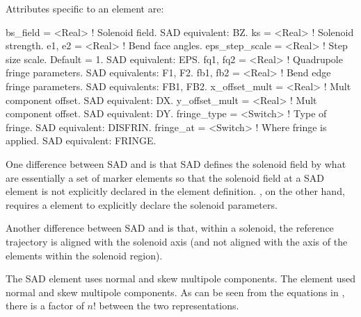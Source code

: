 {
Attributes specific to an  element are:
\begin{example}
  bs_field        = <Real>    ! Solenoid field. SAD equivalent: BZ.
  ks              = <Real>    ! Solenoid strength. 
  e1, e2          = <Real>    ! Bend face angles.
  eps_step_scale  = <Real>    ! Step size scale. Default = 1. SAD equivalent: EPS.
  fq1, fq2        = <Real>    ! Quadrupole fringe parameters. SAD equivalents: F1, F2.
  fb1, fb2        = <Real>    ! Bend edge fringe parameters. SAD equivalents: FB1, FB2.
  x_offset_mult   = <Real>    ! Mult component offset. SAD equivalent: DX.
  y_offset_mult   = <Real>    ! Mult component offset. SAD equivalent: DY.
  fringe_type     = <Switch>  ! Type of fringe. SAD equivalent: DISFRIN.
  fringe_at       = <Switch>  ! Where fringe is applied. SAD equivalent: FRINGE.
\end{example}


One difference between SAD and \bmad is that SAD defines the solenoid field by what are essentially
a set of marker elements so that the solenoid field at a SAD  element is not explicitly
declared in the  element definition. \bmad, on the other hand, requires a 
element to explicitly declare the solenoid parameters.

Another difference between SAD and \bmad is that, within a solenoid, the reference trajectory is
aligned with the solenoid axis (and not aligned with the axis of the elements within the solenoid
region).

The SAD  element uses normal  and skew  multipole components. The \bmad
{} element used normal  and skew  multipole components. As can be seen from
the equations in , there is a factor of $n!$ between the two representations.

}
